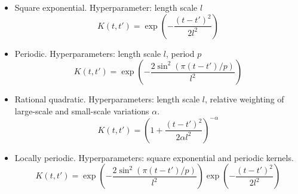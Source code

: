 \documentclass[11pt, a4paper]{article} %
\begin{document}
\begin{itemize}

\item Square exponential. Hyperparameter: length scale $l$\\
\begin{equation*}
K(t,t')= \exp \left( - \frac{ \left( t - t' \right)^2 }{2 l^2} \right)
\end{equation*}

\item Periodic. Hyperparameters: length scale $l$, period $p$\\
\begin{equation*}
K(t,t')= \exp \left(  - \frac{2 \sin^2 \left( \pi (t - t')/p \right)}{l^2} \right)
\end{equation*}

\item Rational quadratic. Hyperparameters: length scale $l$, relative weighting of large-scale and small-scale variations $\alpha$. \\
\begin{equation*}
K(t,t') = \left(  1+ \frac{(t-t')^2}{2 \alpha l^2} \right)^{- \alpha} 
\end{equation*}

\item Locally periodic. Hyperparameters: square exponential and periodic kernels.\\
\begin{equation*}
K(t,t')= \exp \left(  - \frac{2 \sin^2 \left( \pi (t - t')/p \right)}{l^2} \right) \exp \left( - \frac{ \left( t - t' \right)^2 }{2 l^2} \right)
\end{equation*}

\end{itemize}
\end{document}
